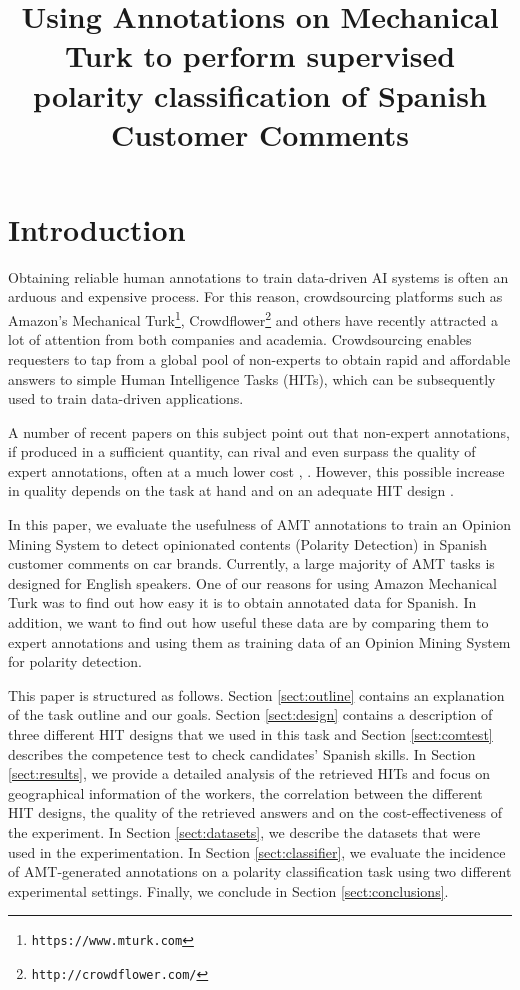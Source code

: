 \documentclass[11pt, a4paper,onecolumn]{article}
\title{Using Annotations on Mechanical Turk to perform supervised polarity classification of Spanish Customer Comments}
\begin{document}
\maketitleabstract

\section{Introduction}
\label{sec:intro}


Obtaining reliable human annotations to train data-driven AI systems is often an arduous and expensive process. For this reason, crowdsourcing platforms such as Amazon's Mechanical Turk\footnote{\texttt{https://www.mturk.com}}, Crowdflower\footnote{\texttt{http://crowdflower.com/}} and others have recently attracted a lot of attention from both companies and academia. Crowdsourcing enables requesters to tap from a global pool of non-experts to obtain rapid and affordable answers to simple Human Intelligence Tasks (HITs), which can be subsequently used to train data-driven applications.

A number of recent papers on this subject point out that non-expert annotations, if produced in a sufficient quantity, can rival and even surpass the quality of expert annotations, often at a much lower cost \cite{snow_cheap_2008}, \cite{su_internet-scale_2007}. However, this possible increase in quality depends on the task at hand and on an adequate HIT design \cite{kittur_crowdsourcing_2008}. 

In this paper, we evaluate the usefulness of AMT annotations to train an Opinion Mining System to detect opinionated contents (Polarity Detection) in Spanish customer comments on car brands. Currently, a large majority of AMT tasks is designed for English speakers. One of our reasons for using Amazon Mechanical Turk was to find out how easy it is to obtain annotated data for Spanish. In addition, we want to find out how useful these data are by comparing them to expert annotations and using them as training data of an Opinion Mining System for polarity detection.

This paper is structured as follows. Section \ref{sect:outline} contains an explanation of the task outline and our goals. Section \ref{sect:design} contains a description of three different HIT designs that we used in this task and Section \ref{sect:comtest} describes the competence test to check candidates' Spanish skills. In Section \ref{sect:results}, we provide a detailed analysis of the retrieved HITs and focus on geographical information of the workers, the correlation between the different HIT designs, the quality of the retrieved answers and on the cost-effectiveness of  the experiment. In Section \ref{sect:datasets}, we describe the datasets that were used in the experimentation. In Section \ref{sect:classifier}, we evaluate the incidence of AMT-generated annotations on a polarity classification task using two different experimental settings. Finally, we conclude in Section \ref{sect:conclusions}.
\end{document}
